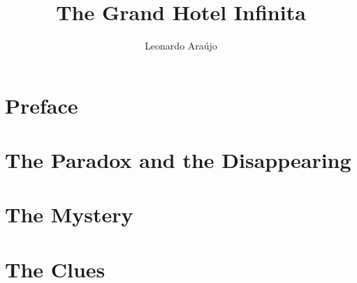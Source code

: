 \documentclass[openany]{book} %
\title{The Grand Hotel Infinita}
\author{Leonardo Araújo}
\date{}
\begin{document}
\thispagestyle{empty}



\clearpage
\thispagestyle{empty} %
\mbox{}
\clearpage

{} %
\setcounter{page}{1}
\maketitle
\thispagestyle{empty}



\Large
\tableofcontents %

\clearpage

\clearpage 
\chapter*{Preface} %



\clearpage

\clearpage
\chapter{The Paradox and the Disappearing}



\clearpage

\clearpage
\chapter{The Mystery}


\clearpage

\clearpage
\chapter{The Clues}

\end{document}
